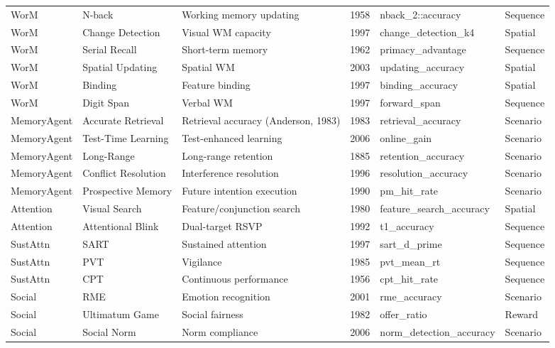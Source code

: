 \documentclass[10pt,landscape]{article}
\begin{document}
\begin{longtable}{@{}p{2.3cm}p{3.0cm}p{4.5cm}p{0.6cm}p{3.8cm}p{1.8cm}@{}}
\midrule
WorM & N-back & Working memory updating \citep{jaeggi2010relationship} & 1958 & nback\_2::accuracy & Sequence \\
WorM & Change Detection & Visual WM capacity \citep{luck1997capacity} & 1997 & change\_detection\_k4 & Spatial \\
WorM & Serial Recall & Short-term memory \citep{murdock1962serial} & 1962 & primacy\_advantage & Sequence \\
WorM & Spatial Updating & Spatial WM \citep{oberauer2003selective} & 2003 & updating\_accuracy & Spatial \\
WorM & Binding & Feature binding \citep{luck1997capacity} & 1997 & binding\_accuracy & Spatial \\
WorM & Digit Span & Verbal WM \citep{wechsler2008wais} & 1997 & forward\_span & Sequence \\

\midrule
MemoryAgent & Accurate Retrieval & Retrieval accuracy (Anderson, 1983) & 1983 & retrieval\_accuracy & Scenario \\
MemoryAgent & Test-Time Learning & Test-enhanced learning & 2006 & online\_gain & Scenario \\
MemoryAgent & Long-Range & Long-range retention & 1885 & retention\_accuracy & Scenario \\
MemoryAgent & Conflict Resolution & Interference resolution & 1996 & resolution\_accuracy & Scenario \\
MemoryAgent & Prospective Memory & Future intention execution & 1990 & pm\_hit\_rate & Scenario \\

\midrule
Attention & Visual Search & Feature/conjunction search & 1980 & feature\_search\_accuracy & Spatial \\
Attention & Attentional Blink & Dual-target RSVP & 1992 & t1\_accuracy & Sequence \\

\midrule
SustAttn & SART & Sustained attention \citep{robertson1997sustained} & 1997 & sart\_d\_prime & Sequence \\
SustAttn & PVT & Vigilance & 1985 & pvt\_mean\_rt & Sequence \\
SustAttn & CPT & Continuous performance & 1956 & cpt\_hit\_rate & Sequence \\

\midrule
Social & RME & Emotion recognition \citep{baroncohen2001eyes} & 2001 & rme\_accuracy & Scenario \\
Social & Ultimatum Game & Social fairness \citep{guth1982experimental} & 1982 & offer\_ratio & Reward \\
Social & Social Norm & Norm compliance & 2006 & norm\_detection\_accuracy & Scenario \\


\end{longtable}
\end{document}
